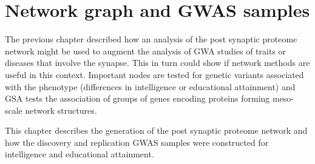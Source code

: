 \chapter{Network graph and GWAS samples}




The previous chapter described how an analysis of the post synaptic proteome network might be used to augment the analysis of GWA studies of traits or diseases that involve the synapse. This in turn could show if network methods are useful in this context.  Important nodes are tested for genetic variants associated with the phenotype (differences in intelligence or educational attainment) and GSA tests the association of  groups of genes encoding proteins forming meso-scale network structures. 

This chapter describes the generation of the post synaptic proteome network and how the discovery and replication GWAS samples were constructed  for intelligence and educational attainment.





